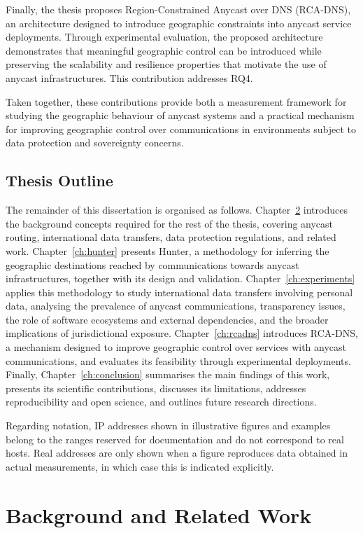 \documentclass[
A4paper,                %
twoside,                %
openright,              %
chapterprefix=true,     %
12pt,                   %
headings=normal,        %
titlepage=on            %
]{book}
\begin{document}
Finally, the thesis proposes Region-Constrained Anycast over DNS (RCA-DNS), an architecture designed to introduce geographic constraints into anycast service deployments. Through experimental evaluation, the proposed architecture demonstrates that meaningful geographic control can be introduced while preserving the scalability and resilience properties that motivate the use of anycast infrastructures. This contribution addresses RQ4.

Taken together, these contributions provide both a measurement framework for studying the geographic behaviour of anycast systems and a practical mechanism for improving geographic control over communications in environments subject to data protection and sovereignty concerns.

\section{Thesis Outline}
\label{sc:introduction_outline}

The remainder of this dissertation is organised as follows. Chapter~\ref{ch:background} introduces the background concepts required for the rest of the thesis, covering anycast routing, international data transfers, data protection regulations, and related work. Chapter~\ref{ch:hunter} presents Hunter, a methodology for inferring the geographic destinations reached by communications towards anycast infrastructures, together with its design and validation. Chapter~\ref{ch:experiments} applies this methodology to study international data transfers involving personal data, analysing the prevalence of anycast communications, transparency issues, the role of software ecosystems and external dependencies, and the broader implications of jurisdictional exposure. Chapter~\ref{ch:rcadns} introduces RCA-DNS, a mechanism designed to improve geographic control over services with anycast communications, and evaluates its feasibility through experimental deployments. Finally, Chapter~\ref{ch:conclusion} summarises the main findings of this work, presents its scientific contributions, discusses its limitations, addresses reproducibility and open science, and outlines future research directions.

Regarding notation, IP addresses shown in illustrative figures and examples belong to the ranges reserved for documentation \cite{Arkko2010IPv4Documentation} and do not correspond to real hosts. Real addresses are only shown when a figure reproduces data obtained in actual measurements, in which case this is indicated explicitly.
 \newpage 
 \newpage \chapter{Background and Related Work}
\label{ch:background}
\end{document}
